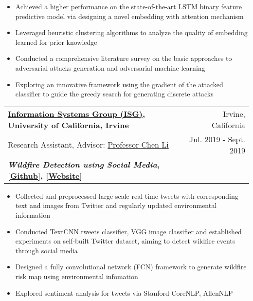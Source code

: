 \documentclass[letterpaper,11pt]{article}
\makeatletter
\newcommand{\resumeSubheading}[6]{
  \vspace{-1pt}\item
    \begin{tabular*}{0.97\textwidth}[t]{l@{\extracolsep{\fill}}r}
      \textbf{#1} & #2 \\
      #3 & #4 \\
      \textbf{#5} & \textbf{#6} \\
    \end{tabular*}\vspace{-5pt}
}
\makeatother
\begin{document}
        \begin{itemize}
          \item Achieved a higher performance on the state-of-the-art LSTM binary feature predictive model via designing a novel embedding with attention mechanism
          
          \item Leveraged heuristic clustering algorithms to analyze the quality of embedding learned for prior knowledge
          
          \item Conducted a comprehensive literature survey on the basic approaches to adversarial attacks generation and adversarial machine learning
          
          \item Exploring an innovative framework using the gradient of the attacked classifier to guide the greedy search for generating discrete attacks
          
        \end{itemize}
        
    \resumeSubheading
      {\href{https://isg.ics.uci.edu/}{Information Systems Group (ISG)}, University of California, Irvine}{Irvine, California}
      {Research Assistant, Advisor: \href{https://chenli.ics.uci.edu/}{Professor Chen Li}}{Jul. 2019 - Sept. 2019}
      {\textit{Wildfire Detection using Social Media}, [\href{https://github.com/ISG-ICS/Wildfires}{Github}], [\href{http://wildfires.ics.uci.edu:2333/}{Website}]}{}
      
        \begin{itemize}
          \item Collected and preprocessed large scale real-time tweets with corresponding text and images from Twitter and regularly updated environmental information
          
          \item Conducted TextCNN tweets classifier, VGG image classifier and established experiments on self-built Twitter dataset, aiming to detect wildfire events through social media
          
          \item Designed a fully convolutional network (FCN) framework to generate wildfire risk map using environmental infomation
          
          \item Explored sentiment analysis for tweets via Stanford CoreNLP, AllenNLP
        \end{itemize}
        
\end{document}
